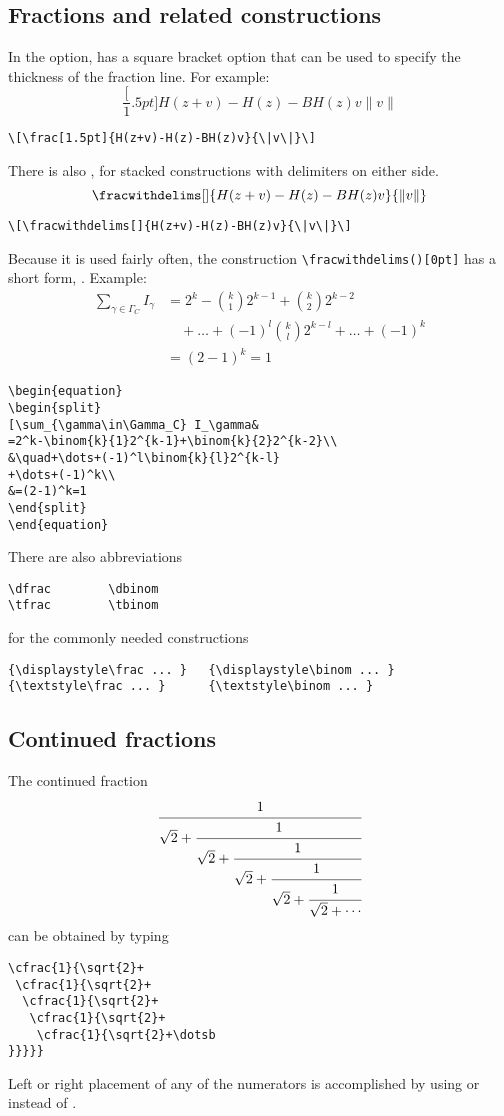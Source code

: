 \subsection{Fractions and related constructions}
\label{fracs}
In the  option,
 has a square bracket option that can be used
to specify the thickness of the fraction line.  For example:
\[\frac[1.5pt]{H(z+v)-H(z)-BH(z)v}{\|v\|}\]
\begin{verbatim}
\[\frac[1.5pt]{H(z+v)-H(z)-BH(z)v}{\|v\|}\]
\end{verbatim}
There is also , for stacked
constructions with delimiters on either side.
\[\fracwithdelims[]{H(z+v)-H(z)-BH(z)v}{\|v\|}\]
\begin{verbatim}
\[\fracwithdelims[]{H(z+v)-H(z)-BH(z)v}{\|v\|}\]
\end{verbatim}
Because it is used fairly often, the construction
\verb=\fracwithdelims()[0pt]= has a short form,
.
Example:
\begin{equation}
\begin{split}
\sum_{\gamma\in\Gamma_C} I_\gamma&
=2^k-\binom{k}{1}2^{k-1}+\binom{k}{2}2^{k-2}\\
&\quad+\dots+(-1)^l\binom{k}{l}2^{k-l}
+\dots+(-1)^k\\
&=(2-1)^k=1
\end{split}
\end{equation}
\begin{verbatim}
\begin{equation}
\begin{split}
[\sum_{\gamma\in\Gamma_C} I_\gamma&
=2^k-\binom{k}{1}2^{k-1}+\binom{k}{2}2^{k-2}\\
&\quad+\dots+(-1)^l\binom{k}{l}2^{k-l}
+\dots+(-1)^k\\
&=(2-1)^k=1
\end{split}
\end{equation}
\end{verbatim}
There are also abbreviations
\begin{verbatim}
\dfrac        \dbinom
\tfrac        \tbinom
\end{verbatim}
for the commonly needed constructions
\begin{verbatim}
{\displaystyle\frac ... }   {\displaystyle\binom ... }
{\textstyle\frac ... }      {\textstyle\binom ... }
\end{verbatim}              

\subsection{Continued fractions}
The continued fraction
\begin{equation}
\cfrac{1}{\sqrt{2}+
 \cfrac{1}{\sqrt{2}+
  \cfrac{1}{\sqrt{2}+
   \cfrac{1}{\sqrt{2}+
    \cfrac{1}{\sqrt{2}+\dotsb
}}}}}
\end{equation}
can be obtained by typing
{\samepage
\begin{verbatim}
\cfrac{1}{\sqrt{2}+
 \cfrac{1}{\sqrt{2}+
  \cfrac{1}{\sqrt{2}+
   \cfrac{1}{\sqrt{2}+
    \cfrac{1}{\sqrt{2}+\dotsb
}}}}}
\end{verbatim}
}Left or right placement of any of the numerators is accomplished by using
 or  instead of .


